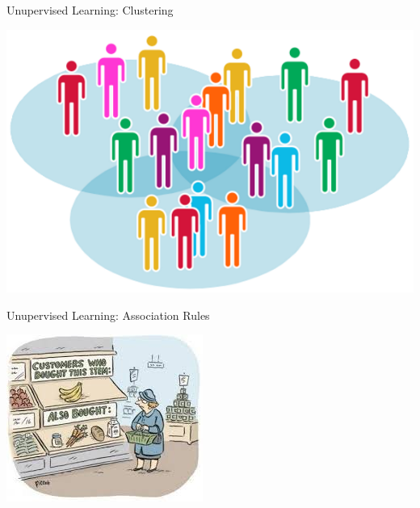 \documentclass{beamer}
\begin{document}
\begin{frame}{Unupervised Learning: Clustering}

\begin{center}
\includegraphics[width=.7\textwidth]{figs/clustering}
\end{center}

\end{frame}

\begin{frame}{Unupervised Learning: Association Rules}

\begin{center}
\includegraphics[width=.7\textwidth]{figs/associationRules}
\end{center}

\end{frame}
\end{document}
